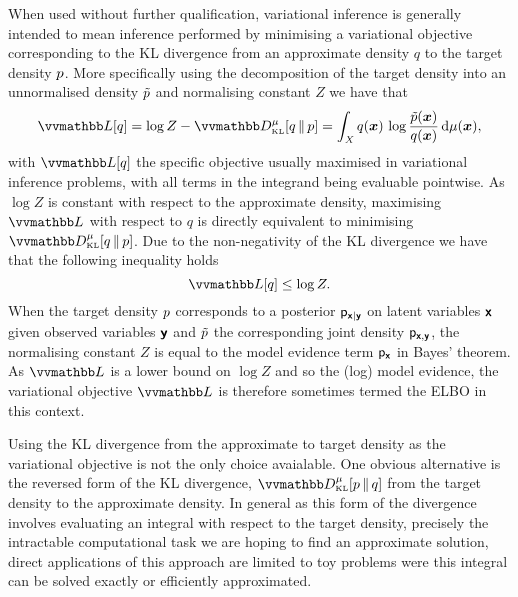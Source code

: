 When used without further qualification, variational inference is generally intended to mean inference performed by minimising a variational objective corresponding to the \ac{KL} divergence from an approximate density $q$ to the target density $p$. More specifically using the decomposition of the target density into an unnormalised density $\tilde{p}$ and normalising constant $Z$ we have that
\begin{equation}\label{eq:kullback-leibler-var-obj}
  \varobj\lsb q \rsb = \log Z - \kldiv[\mu]{q}{\tgtdens} =
  \int_{\set{X}} q(\vct{x})\,\log \frac{\utgtdens(\vct{x})}{q(\vct{x})} \,\dr\mu(\vct{x}),
\end{equation}
with $\varobj\lsb q \rsb$ the specific objective usually maximised in variational inference problems, with all terms in the integrand being evaluable pointwise. As $\log Z$ is constant with respect to the approximate density, maximising $\varobj$ with respect to $q$ is directly equivalent to minimising $\kldiv[\mu]{q}{\tgtdens}$. Due to the non-negativity of the \ac{KL} divergence we have that the following inequality holds
\begin{equation}\label{eq:evidence-lower-bound}
  \varobj\lsb q \rsb \leq \log Z.
\end{equation}
When the target density $p$ corresponds to a posterior $\mathsf{p}_{\boldsymbol{\mathsf{x}}|\boldsymbol{\mathsf{y}}}$ on latent variables $\boldsymbol{\mathsf{x}}$ given observed variables $\boldsymbol{\mathsf{y}}$ and $\tilde{p}$ the corresponding joint density $\mathsf{p}_{\boldsymbol{\mathsf{x}},\boldsymbol{\mathsf{y}}}$, the normalising constant $Z$ is equal to the model evidence term $\mathsf{p}_{\boldsymbol{\mathsf{x}}}$ in Bayes' theorem. As $\varobj$ is a lower bound on $\log Z$ and so the (log) model evidence, the variational objective $\varobj$ is therefore sometimes termed the \ac{ELBO} in this context.

Using the \ac{KL} divergence from the approximate to target density as the variational objective is not the only choice avaialable. One obvious alternative is the reversed form of the \ac{KL} divergence, $\kldiv[\mu]{\tgtdens}{q}$ from the target density to the approximate density. In general as this form of the divergence involves evaluating an integral with respect to the target density, precisely the intractable computational task we are hoping to find an approximate solution, direct applications of this approach are limited to toy problems were this integral can be solved exactly or efficiently approximated. 

